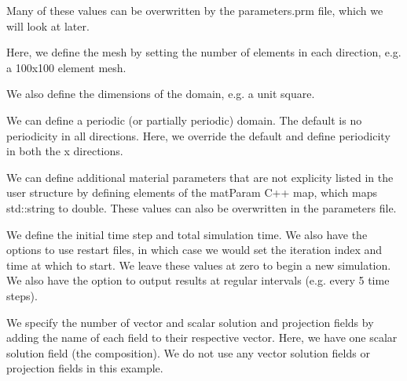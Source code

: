 Many of these values can be overwritten by the parameters.\-prm file, which we will look at later.


\begin{DoxyCodeInclude}

\end{DoxyCodeInclude}


Here, we define the mesh by setting the number of elements in each direction, e.\-g. a 100x100 element mesh.


\begin{DoxyCodeInclude}

\end{DoxyCodeInclude}


We also define the dimensions of the domain, e.\-g. a unit square.


\begin{DoxyCodeInclude}

\end{DoxyCodeInclude}


We can define a periodic (or partially periodic) domain. The default is no periodicity in all directions. Here, we override the default and define periodicity in both the x directions.


\begin{DoxyCodeInclude}

\end{DoxyCodeInclude}


We can define additional material parameters that are not explicity listed in the {\ttfamily user} structure by defining elements of the {\ttfamily mat\-Param} C++ map, which maps {\ttfamily std\-::string} to {\ttfamily double}. These values can also be overwritten in the parameters file.


\begin{DoxyCodeInclude}

\end{DoxyCodeInclude}


We define the initial time step and total simulation time. We also have the options to use restart files, in which case we would set the iteration index and time at which to start. We leave these values at zero to begin a new simulation. We also have the option to output results at regular intervals (e.\-g. every 5 time steps).


\begin{DoxyCodeInclude}

\end{DoxyCodeInclude}


We specify the number of vector and scalar solution and projection fields by adding the name of each field to their respective vector. Here, we have one scalar solution field (the composition). We do not use any vector solution fields or projection fields in this example.


